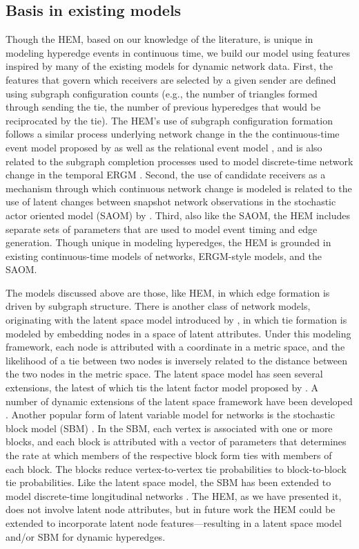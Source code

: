 \documentclass[ba]{imsart}
\numberwithin{equation}{section}
\theoremstyle{plain}
\begin{document}
\subsection{Basis in existing models}

Though the HEM, based on our knowledge of the literature, is unique in modeling hyperedge events in continuous time, we build our model using features inspired by many of the existing models for dynamic network data. First, the features that govern which receivers are selected by a given sender are defined using subgraph configuration counts (e.g., the number of triangles formed through sending the tie, the number of previous hyperedges that would be reciprocated by the tie). The HEM's use of subgraph configuration formation follows a similar process underlying network change in the the continuous-time event model proposed by \cite{PerryWolfe2012} as well as the relational event model \citep{Butts2008}, and is also related to the subgraph completion processes used to model discrete-time network change in the temporal ERGM \citep{hanneke2010discrete}. Second, the use of candidate receivers as a mechanism through which continuous network change is modeled is related to the use of latent changes between snapshot network observations in the stochastic actor oriented model (SAOM) by \cite{snijders1996stochastic}.  Third, also like the SAOM, the HEM includes separate sets of parameters that are used to model event timing and edge generation. Though unique in modeling hyperedges, the HEM is grounded in existing continuous-time models of networks, ERGM-style models, and the SAOM.

The models discussed above are those, like HEM,  in which edge formation is driven by subgraph structure. There is another class of network models, originating with the latent space model introduced by \cite{hoff2002}, in which tie formation is modeled by embedding nodes in a space of latent attributes. Under this modeling framework, each node is attributed with a coordinate in a metric space, and the likelihood of a tie between two nodes is inversely related to the distance between the two nodes in the metric space. The latent space model has seen several extensions, the latest of which tis the latent factor model proposed by \cite{minhas2016inferential}. A number of dynamic extensions of the latent space framework have been developed \citep[e.g., ][]{sarkar2005dynamic,sewell2015latent,ward2013gravity}. Another popular form of latent variable model for networks is the stochastic block model (SBM) \citep{holland1983stochastic,airoldi2008mixed}. In the SBM, each vertex is associated with one or more blocks, and each block is attributed with a vector of parameters that determines the rate at which members of the respective block form ties with members of each block. The blocks reduce vertex-to-vertex tie probabilities to block-to-block tie probabilities. Like the latent space model, the SBM has been extended to model discrete-time longitudinal networks  \citep{matias2017statistical}. The HEM, as we have presented it, does not involve latent node attributes, but in future work the HEM could be extended to incorporate latent node features---resulting in a latent space model and/or SBM for dynamic hyperedges.
\end{document}
